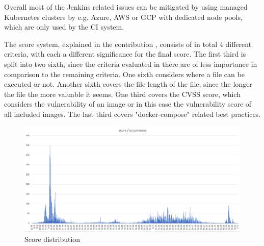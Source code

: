 Overall most of the Jenkins related issues can be mitigated by using managed Kubernetes clusters by e.g. Azure, AWS or GCP with dedicated node pools, which are only used by the CI system.

The score system, explained in the contribution , consists of in total 4 different criteria, with each a different significance for the final score. The first third is split into two sixth, since the criteria evaluated in there are of less importance in comparison to the remaining criteria. One sixth considers where a file can be executed or not. Another sixth covers the file length of the file, since the longer the file the more valuable it seems. One third covers the CVSS score, which considers the vulnerability of an image or in this case the vulnerability score of all included images. The last third covers "docker-compose" related best practices.

\begin{figure}[H]
    \centering
    \includegraphics[scale=0.5]{graphics/deployment_score.png}
    \caption{Score distribution}
    \label{fig:deployment_score}
\end{figure}

